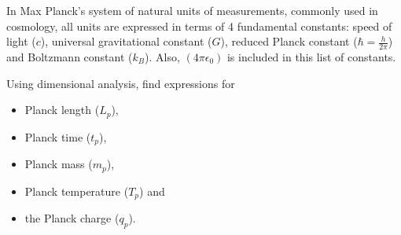 In Max Planck's system of natural units of measurements, commonly used in
cosmology, all units are expressed in terms of 4 fundamental constants: speed
of light ($c$), universal gravitational constant ($G$), reduced Planck
constant ($\hbar = \frac{h}{2\pi}$) and Boltzmann constant ($k_B$). Also,
$(4\pi\epsilon_0)$ is included in this list of constants.

Using dimensional analysis, find expressions for
\begin{itemize}
\item Planck length ($L_p$),
\item Planck time ($t_p$),
\item Planck mass ($m_p$),
\item Planck temperature ($T_p$) and
\item the Planck charge ($q_p$).
\end{itemize}
